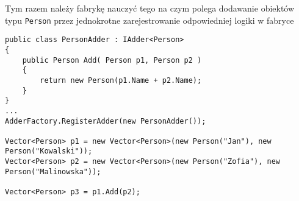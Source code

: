 Tym razem należy fabrykę nauczyć tego na czym polega dodawanie obiektów typu {\tt Person} przez 
jednokrotne zarejestrowanie odpowiedniej logiki w fabryce

\begin{scriptsize}
\begin{verbatim}
public class PersonAdder : IAdder<Person>
{
    public Person Add( Person p1, Person p2 )
    {
        return new Person(p1.Name + p2.Name);
    }
}
...
AdderFactory.RegisterAdder(new PersonAdder());

Vector<Person> p1 = new Vector<Person>(new Person("Jan"), new Person("Kowalski"));
Vector<Person> p2 = new Vector<Person>(new Person("Zofia"), new Person("Malinowska"));

Vector<Person> p3 = p1.Add(p2);
\end{verbatim}
\end{scriptsize}
